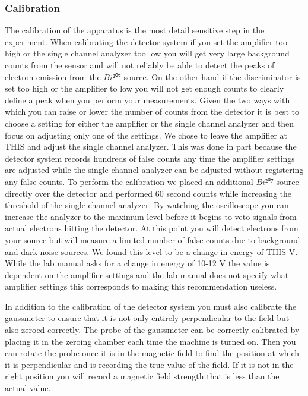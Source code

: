 \subsubsection{Calibration}
The calibration of the apparatus is the most detail sensitive step in the experiment.  When calibrating the detector system if you set the amplifier too high or the single channel analyzer too low you will get very large background counts from the sensor and will not reliably be able to detect the peaks of electron emission from the $Bi²⁰⁷$ source.  On the other hand if the discriminator is set too high or the amplifier to low you will not get enough counts to clearly define a peak when you perform your measurements. Given the two ways with which you can raise or lower the number of counts from the detector it is best to choose a setting for either the amplifier or the single channel analyzer and then focus on adjusting only one of the settings.  We chose to leave the amplifier at THIS and adjust the single channel analyzer.  This was done in part because the detector system records hundreds of false counts any time the amplifier settings are adjusted while the single channel analyzer can be adjusted without registering any false counts. To perform the calibration we placed an additional $Bi²⁰⁷$ source directly over the detector and performed 60 second counts while increasing the threshold of the single channel analyzer. By watching the oscilloscope you can increase the analyzer to the maximum level before it begins to veto signals from actual electrons hitting the detector. At this point you will detect electrons from your source but will measure a limited number of false counts due to background and dark noise sources.  We found this level to be a change in energy of THIS V.  While the lab manual asks for a change in energy of 10-12 V the value is dependent on the amplifier settings and the lab manual does not specify what amplifier settings this corresponds to making this recommendation useless.

In addition to the calibration of the detector system you must also calibrate the gaussmeter to ensure that it is not only entirely perpendicular to the field but also zeroed correctly.  The probe of the gaussmeter can be correctly calibrated by placing it in the zeroing chamber each time the machine is turned on. Then you can rotate the probe once it is in the magnetic field to find the position at which it is perpendicular and is recording the true value of the field. If it is not in the right position you will record a magnetic field strength that is less than the actual value.  

